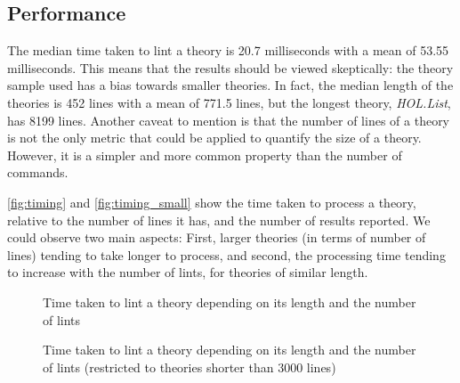 \subsection{Performance}
The median time taken to lint a theory is 20.7 milliseconds with a mean
of 53.55 milliseconds. This means that the results should be viewed
skeptically: the theory sample used has a bias towards smaller 
theories. In fact, the median length of the theories is 452 lines with
a mean of 771.5 lines, but the longest theory, \textit{HOL.List}, has 8199
lines. Another
caveat to mention is that the number of lines of a theory is not the
only metric that could be applied to quantify the size of a theory.
However, it is a simpler and more common property than the number of commands.

\autoref{fig:timing} and \autoref{fig:timing_small}
show the time taken to process a theory, relative
to the number of lines it has, and the number of results reported.
We could observe two main aspects: First, larger 
theories (in terms of number of lines) tending to take longer to process,
and second, the processing time tending to increase with the number of 
lints, for theories of similar length. 

\begin{figure}
    \centering
    
    \caption[Linting time (All theories)]{Time taken to lint a theory depending on its
    length and the number of lints} \label{fig:timing}
\end{figure}

\begin{figure}
    \centering
    
    \caption[Linting time (Theories smaller than 3000 lines)]{Time taken to lint a theory depending on its
    length and the number of lints (restricted to
    theories shorter than 3000 lines) } \label{fig:timing_small}
\end{figure}

